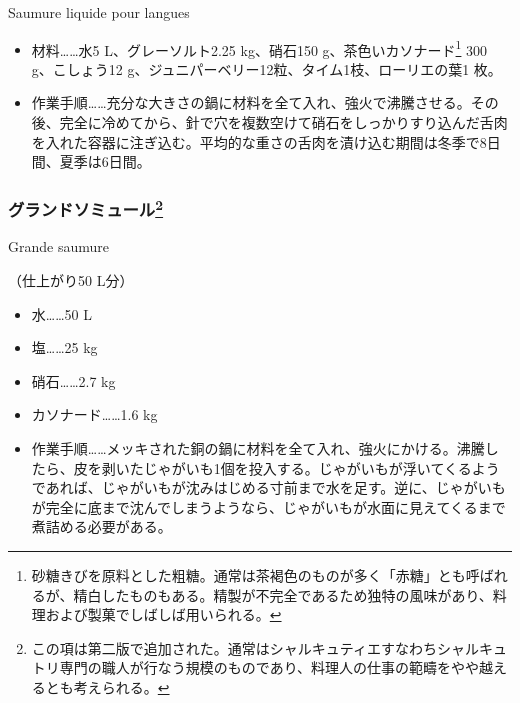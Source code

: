 \begin{recette}
\begin{frsubenv}

Saumure liquide pour langues

\end{frsubenv}


\begin{itemize}
\item
  材料\ldots{}\ldots{}水5 L、グレーソルト2.25 kg、硝石150
  g、茶色いカソナード\footnote{砂糖きびを原料とした粗糖。通常は茶褐色のものが多く「赤糖」とも呼ばれるが、精白したものもある。精製が不完全であるため独特の風味があり、料理および製菓でしばしば用いられる。}
  300 g、こしょう12 g、ジュニパーベリー12粒、タイム1枝、ローリエの葉1
  枚。
\item
  作業手順\ldots{}\ldots{}充分な大きさの鍋に材料を全て入れ、強火で沸騰させる。その後、完全に冷めてから、針で穴を複数空けて硝石をしっかりすり込んだ舌肉を入れた容器に注ぎ込む。平均的な重さの舌肉を漬け込む期間は冬季で8日間、夏季は6日間。
\end{itemize}

\atoaki{}

\hypertarget{grande-saumure}{%
\subsubsection[グランドソミュール]{\texorpdfstring{グランドソミュール\footnote{この項は第二版で追加された。通常はシャルキュティエすなわちシャルキュトリ専門の職人が行なう規模のものであり、料理人の仕事の範疇をやや越えるとも考えられる。}}{グランドソミュール}}\label{grande-saumure}}

\begin{frsubenv}

Grande saumure

\end{frsubenv}


（仕上がり50 L分）

\begin{itemize}
\tightlist
\item
  水\ldots{}\ldots{}50 L
\item
  塩\ldots{}\ldots{}25 kg
\item
  硝石\ldots{}\ldots{}2.7 kg
\item
  カソナード\ldots{}\ldots{}1.6 kg
\item
  作業手順\ldots{}\ldots{}メッキされた銅の鍋に材料を全て入れ、強火にかける。沸騰したら、皮を剥いたじゃがいも1個を投入する。じゃがいもが浮いてくるようであれば、じゃがいもが沈みはじめる寸前まで水を足す。逆に、じゃがいもが完全に底まで沈んでしまうようなら、じゃがいもが水面に見えてくるまで煮詰める必要がある。
\end{itemize}


\end{recette}
